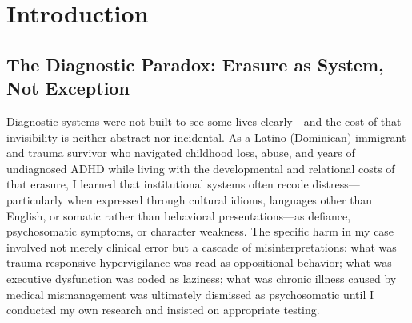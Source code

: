 \documentclass[12pt,a4paper]{article}
\begin{document}
\begin{abstract}
The central thesis is that diagnostic AI must be treated as a justice-critical institution with enforceable equity requirements, not optional enhancements. If documented diagnostic harm concentrates in CLD populations, and those populations carry historical legacies of medical neglect and racialized dismissal, then precaution is not perfectionism—it is a basic safety stance. EQUITAS operationalizes this principle through explicit performance thresholds (equalized-odds gaps $\leq 3\%$, true-positive-rate ratios $0.9$--$1.1$), mandatory community veto authority, continuous monitoring with automatic escalation and suspension protocols, and public harm ledgers that document where benefits and harms fall. The call to action is not simply ``build fairer models.'' It is to change who gets to decide what ``fair'' means and what happens when fairness fails.

\vspace{0.5em}


\end{abstract}

\clearpage
\footnotesize\tableofcontents
\clearpage

\section{Introduction}

\subsection{The Diagnostic Paradox: Erasure as System, Not Exception}

Diagnostic systems were not built to see some lives clearly—and the cost of that invisibility is neither abstract nor incidental. As a Latino (Dominican) immigrant and trauma survivor who navigated childhood loss, abuse, and years of undiagnosed ADHD while living with the developmental and relational costs of that erasure, I learned that institutional systems often recode distress—particularly when expressed through cultural idioms, languages other than English, or somatic rather than behavioral presentations—as defiance, psychosomatic symptoms, or character weakness. \cite{garcia_ed415} The specific harm in my case involved not merely clinical error but a cascade of misinterpretations: what was trauma-responsive hypervigilance was read as oppositional behavior; what was executive dysfunction was coded as laziness; what was chronic illness caused by medical mismanagement was ultimately dismissed as psychosomatic until I conducted my own research and insisted on appropriate testing.\cite{garcia_ed415}
\end{document}
